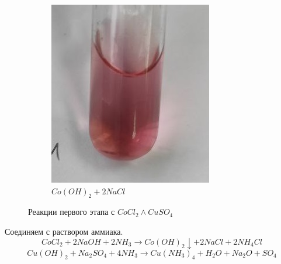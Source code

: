 \begin{figure}[h]
\begin{subfigure}[b]{0.45\textwidth}
    \includegraphics[width=\textwidth]{Ex_5/Co_1.jpg}
    \caption{$Co(OH)_2 + 2NaCl$}
    \end{subfigure}
    \caption{Реакции первого этапа с $CoCl_2 \land CuSO_4$}
\end{figure}

Соединяем с раствором аммиака.
\begin{equation}
    CoCl_2 + 2NaOH + 2NH_3 \xrightarrow{} Co(OH)_2 \downarrow + 2NaCl + 2NH_4Cl
\end{equation}
\begin{equation}
    Cu(OH)_2 + Na_2SO_4 + 4NH_3 \xrightarrow{} Cu(NH_3)_4 + H_2O + Na_2O + SO_4
\end{equation}

